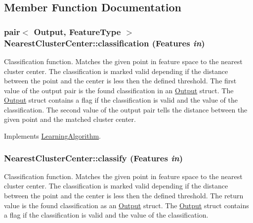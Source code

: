 \subsection{Member Function Documentation}
\hypertarget{classNearestClusterCenter_a49853a2af22ba1688ac438a376d53c42}{
\subsubsection[{classification}]{\setlength{\rightskip}{0pt plus 5cm}pair$<$ {\bf Output}, FeatureType $>$ NearestClusterCenter::classification (Features {\em in})}}
\label{classNearestClusterCenter_a49853a2af22ba1688ac438a376d53c42}
Classification function. Matches the given point in feature space to the nearest cluster center. The classification is marked valid depending if the distance between the point and the center is less then the defined threshold. The first value of the output pair is the found classification in an \hyperlink{structOutput}{Output} struct. The \hyperlink{structOutput}{Output} struct contains a flag if the classification is valid and the value of the classification. The second value of the output pair tells the distance between the given point and the matched cluster center. 

Implements \hyperlink{classLearningAlgorithm}{LearningAlgorithm}.\hypertarget{classNearestClusterCenter_ad2df5aaa3dabc0ef398a24872937b878}{
\subsubsection[{classify}]{ NearestClusterCenter::classify (Features {\em in})}}
\label{classNearestClusterCenter_ad2df5aaa3dabc0ef398a24872937b878}
Classification function. Matches the given point in feature space to the nearest cluster center. The classification is marked valid depending if the distance between the point and the center is less then the defined threshold. The return value is the found classification as an \hyperlink{structOutput}{Output} struct. The \hyperlink{structOutput}{Output} struct contains a flag if the classification is valid and the value of the classification. 

